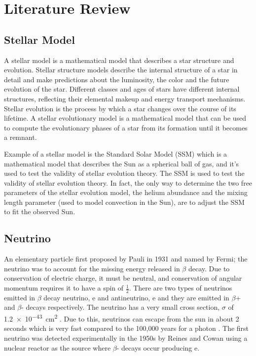 \section{Literature Review}

\subsection{Stellar Model}

A stellar model is a mathematical model that describes a star structure and evolution. Stellar structure models describe the internal structure of a star in detail and make predictions about the luminosity, the color and the future evolution of the star. Different classes and ages of stars have different internal structures, reflecting their elemental makeup and energy transport mechanisms. Stellar evolution is the process by which a star changes over the course of its lifetime. A stellar evolutionary model is a mathematical model that can be used to compute the evolutionary phases of a star from its formation until it becomes a remnant.

Example of a stellar model is the Standard Solar Model (SSM) which is a mathematical model that describes the Sun as a spherical ball of gas, and it's used to test the validity of stellar evolution theory. The SSM is used to test the validity of stellar evolution theory. In fact, the only way to determine the two free parameters of the stellar evolution model, the helium abundance and the mixing length parameter (used to model convection in the Sun), are to adjust the SSM to fit the observed Sun.

\subsection{Neutrino}

An elementary particle first proposed by Pauli in 1931 and named by Fermi; the neutrino was to account for the missing energy released in $\beta$ decay. Due to conservation of electric charge, it must be neutral, and conservation of angular momentum requires it to have a spin of $\frac{1}{2}$. There are two types of neutrinos emitted in $\beta$ decay neutrino, e and antineutrino, e and they are emitted in $\beta$+ and $\beta$- decays respectively. The neutrino has a very small cross section, $\sigma$ of \SI{1.2e-43}{\centi\meter\squared} . Due to this, neutrinos can escape from the sun in about 2 seconds which is very fast compared to the 100,000 years for a photon . The first neutrino was detected experimentally in the 1950s by Reines and Cowan using a nuclear reactor as the source where $\beta$- decays occur producing e.

